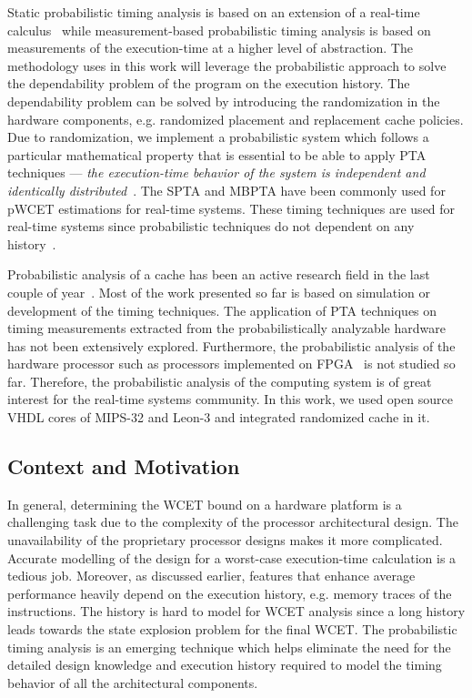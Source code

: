 Static probabilistic timing analysis is based on an extension of a real-time calculus~\cite {Santinelli:2011:TPR:1967021.1967028} while measurement-based probabilistic timing analysis is based on measurements of the execution-time at a higher level of abstraction. The methodology uses in this work will leverage the probabilistic approach to solve the dependability problem of the program on the execution history. The dependability problem can be solved by introducing the randomization in the hardware components, e.g. randomized placement and replacement cache policies. Due to randomization, we implement a probabilistic system which follows a particular mathematical property that is essential to be able to apply PTA techniques --- \textit{the execution-time behavior of the system is independent and identically distributed}~\cite{gumbel1954statistical}.  
The SPTA and MBPTA have been commonly used for pWCET estimations for real-time systems. These timing techniques are used for real-time systems since probabilistic techniques do not dependent on any history~\cite{Kosmidis:2013:CDP:2485288.2485416}. 
% 

Probabilistic analysis of a cache has been an active research field in the last couple of year~\cite{Kosmidis:2013:CDP:2485288.2485416, Jalle:2014:BDT:2616606.2616668}. Most of the work presented so far is based on simulation or development of the timing techniques. The application of PTA techniques on timing measurements extracted from the probabilistically analyzable hardware has not been extensively explored. Furthermore, the probabilistic analysis of the hardware processor such as processors implemented on FPGA~\cite{ION, leon3} is not studied so far. Therefore, the probabilistic analysis of the computing system is of great interest for the real-time systems community. In this work, we used open source VHDL cores of MIPS-32 and Leon-3 and integrated randomized cache in it. 




\subsection{Context and Motivation}

In general, determining the WCET bound on a hardware platform is a challenging task due to the complexity of the processor architectural design. The unavailability of the proprietary processor designs makes it more complicated. Accurate modelling of the design for a worst-case execution-time calculation is a tedious job. Moreover, as discussed earlier, features that enhance average performance heavily depend on the execution history, e.g. memory traces of the instructions. The history is hard to model for WCET analysis since a long history leads towards the state explosion problem for the final WCET. The probabilistic timing analysis is an emerging technique which helps eliminate the need for the detailed design knowledge and execution history required to model the timing behavior of all the architectural components.

